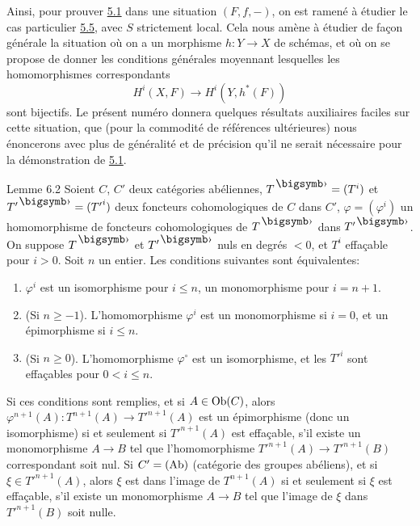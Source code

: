 \documentclass[10pt]{../fichiers-configuration-latex/smfart}
\begin{document}
\subsubsection{}
Ainsi, pour prouver \hyperref[XII.thm5.1]{5.1} dans une situation $(F,f,-)$, on est ramené à
étudier le cas particulier \hyperref[XII.cor5.5]{5.5}, avec $S$ strictement local. Cela nous
amène à étudier de façon générale la situation où on a un morphisme
$h:Y\rightarrow X$ de schémas, et où on se propose de donner les
conditions générales moyennant lesquelles les homomorphismes
correspondants
$$
H^{i}(X,F)\longrightarrow H^{i}(Y,h^{\ast}(F))
$$
sont bijectifs. Le présent numéro donnera quelques résultats
auxiliaires faciles sur cette situation, que (pour la commodité de
références ultérieures) nous énoncerons avec plus de généralité et de
précision qu'il ne serait nécessaire pour la démonstration de \hyperref[XII.thm5.1]{5.1}.

\begin{enonce*}{Lemme 6.2}
Soient $C$, $C'$ deux catégories abéliennes, $T^{\bigdot}=(T^{i})$ et
$T'^{\bigdot}=({T'}^{i})$ deux foncteurs cohomologiques de $C$ dans $C'$,
$\varphi=(\varphi^{i})$ un homomorphisme de foncteurs\pageoriginale
cohomologiques de $T^{\bigdot}$ dans $T'^{\bigdot}$. On suppose 
$T^{\bigdot}$ et $T'^{\bigdot}$ nuls en
degrés $<0$, et $T^{i}$ effaçable pour $i>0$. Soit $n$ un entier. Les
conditions suivantes sont équivalentes:
\begin{enumerate}
\renewcommand{\theenumi}{\alph{enumi}}
\renewcommand{\labelenumi}{\theenumi)}
\item $\varphi^{i}$ est un isomorphisme pour $i\leq n$, un
  monomorphisme pour $i=n+1$.

\item (Si $n\geq -1$). L'homomorphisme $\varphi^{i}$ est un
  monomorphisme si $i=0$, et un épimorphisme si $i\leq n$.

\item (Si $n\geq 0$). L'homomorphisme $\varphi^{\circ}$ est un
  isomorphisme, et les ${T'}^{i}$ sont effaçables pour $0<i\leq n$.
\end{enumerate}

Si ces conditions sont remplies, et si $A\in \operatorname{Ob}(C)$, alors
$\varphi^{n+1}(A):T^{n+1}(A)\rightarrow {T'}^{n+1}(A)$ est un
épimorphisme (donc un isomorphisme) si et seulement si ${T'}^{n+1}(A)$
est effaçable, \ie s'il existe un monomorphisme $A\rightarrow B$ tel que
l'homomorphisme ${T'}^{n+1}(A)\rightarrow {T'}^{n+1}(B)$ correspondant
soit nul. Si $C'=(\operatorname{Ab})$ (catégorie des groupes abéliens), et si $\xi\in
{T'}^{n+1}(A)$, alors $\xi$ est dans l'image de $T^{n+1}(A)$ si et
seulement si $\xi$ est effaçable, \ie s'il existe un monomorphisme
$A\rightarrow B$ tel que l'image de $\xi$ dans ${T'}^{n+1}(B)$ soit nulle.
\end{enonce*}
\end{document}
